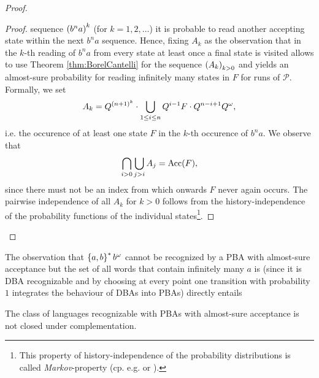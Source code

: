 \begin{proof}
\begin{proof}
    sequence $\left(b^{n}a\right)^{k}$ (for $k = 1, 2, \dots$) it is probable to 
    read another accepting state within the next $b^{n}a$ sequence. Hence, 
    fixing $A_{k}$ as the observation that in the $k$-th reading of $b^{n}a$ 
    from every state at least once a final state is visited allows to use 
    Theorem \ref{thm:BorelCantelli} for the sequence $\left(A_{k}\right)_{k > 0}$ 
    and yields an almost-sure probability for reading infinitely many states in 
    $F$ for runs of $\mathcal{P}$. Formally, we set
    \begin{equation*}
      A_{k} = Q^{\left(n + 1\right)^{k}}\cdot\bigcup_{1\leq i\leq n} Q^{i - 1}F\cdot 
        Q^{n - i + 1} Q^{\omega},
    \end{equation*}
    i.e. the occurence of at least one state $F$ in the $k$-th occurence of 
    $b^{n}a$. We observe that
    \begin{equation*}
      \bigcap_{i > 0}\bigcup_{j > i}A_{j} = \operatorname{Acc}(F),
    \end{equation*}
    since there must not be an index from which onwards $F$ never again occurs.
    The pairwise independence of all $A_{k}$ for $k > 0$ follows from the 
    history-independence of the probability functions of the individual 
    states\footnote{This property of history-independence of the probability 
    distributions is called \emph{Markov}-property (cp. e.g. 
    \cite[Page 8]{Groesser} or \cite[Chapter 17]{Klenke}).}.
  \end{proof}
\end{proof}
The observation that $\left\{a,b\right\}^{*}b^{\omega}$ cannot be recognized by a 
\ac{PBA} with almost-sure acceptance but the set of all words that contain 
infinitely many $a$ is (since it is \ac{DBA} recognizable and by choosing at
every point one transition with probability $1$ integrates the behaviour of
\acp{DBA} into \acp{PBA}) directly entails
\begin{proposition}
  \cite[Theorem 4.4.9 (d)]{Groesser}
  The class of languages recognizable with \acp{PBA} with almost-sure 
  acceptance is not closed under complementation.
  \label{prop:pba=1complement}
\end{proposition}

